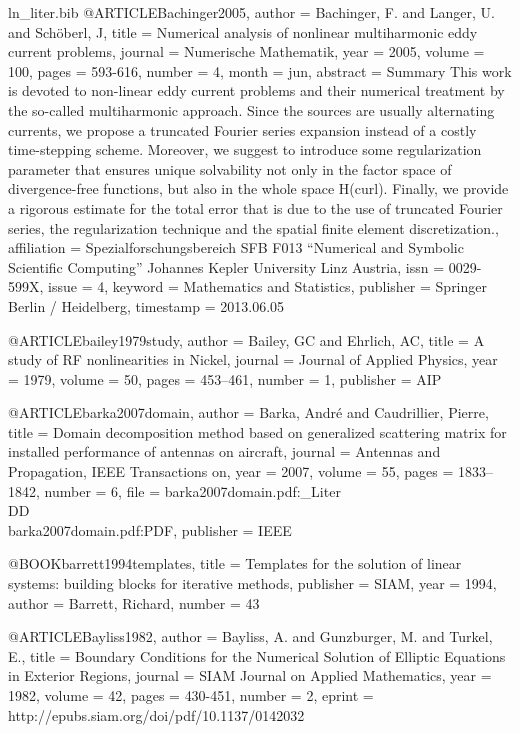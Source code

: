 \begin{filecontents*}{ln_liter.bib}
@ARTICLE{Bachinger2005,
  author = {Bachinger, F. and Langer, U. and Sch\"oberl, J},
  title = {Numerical analysis of nonlinear multiharmonic eddy current problems},
  journal = {Numerische Mathematik},
  year = {2005},
  volume = {100},
  pages = {593-616},
  number = {4},
  month = jun,
  abstract = {Summary This work is devoted to non-linear eddy current problems and
	their numerical treatment by the so-called multiharmonic approach.
	Since the sources are usually alternating currents, we propose a
	truncated Fourier series expansion instead of a costly time-stepping
	scheme. Moreover, we suggest to introduce some regularization parameter
	that ensures unique solvability not only in the factor space of divergence-free
	functions, but also in the whole space H(curl). Finally, we provide
	a rigorous estimate for the total error that is due to the use of
	truncated Fourier series, the regularization technique and the spatial
	finite element discretization.},
  affiliation = {Spezialforschungsbereich SFB F013 “Numerical and Symbolic Scientific
	Computing” Johannes Kepler University Linz Austria},
  issn = {0029-599X},
  issue = {4},
  keyword = {Mathematics and Statistics},
  publisher = {Springer Berlin / Heidelberg},
  timestamp = {2013.06.05}
}

@ARTICLE{bailey1979study,
  author = {Bailey, GC and Ehrlich, AC},
  title = {A study of {RF} nonlinearities in {N}ickel},
  journal = {Journal of Applied Physics},
  year = {1979},
  volume = {50},
  pages = {453--461},
  number = {1},
  publisher = {AIP}
}

@ARTICLE{barka2007domain,
  author = {Barka, Andr{\'e} and Caudrillier, Pierre},
  title = {Domain decomposition method based on generalized scattering matrix
	for installed performance of antennas on aircraft},
  journal = {Antennas and Propagation, IEEE Transactions on},
  year = {2007},
  volume = {55},
  pages = {1833--1842},
  number = {6},
  file = {barka2007domain.pdf:_Liter\\DD\\barka2007domain.pdf:PDF},
  publisher = {IEEE}
}

@BOOK{barrett1994templates,
  title = {Templates for the solution of linear systems: building blocks for
	iterative methods},
  publisher = {SIAM},
  year = {1994},
  author = {Barrett, Richard},
  number = {43}
}

@ARTICLE{Bayliss1982,
  author = {Bayliss, A. and Gunzburger, M. and Turkel, E.},
  title = {Boundary Conditions for the Numerical Solution of Elliptic Equations
	in Exterior Regions},
  journal = {SIAM Journal on Applied Mathematics},
  year = {1982},
  volume = {42},
  pages = {430-451},
  number = {2},
  eprint = {http://epubs.siam.org/doi/pdf/10.1137/0142032}
}


\end{filecontents*}
